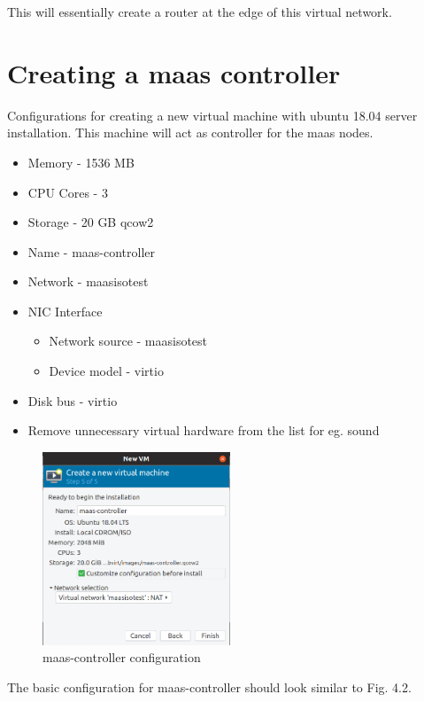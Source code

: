 This will essentially create a router at the edge of this virtual network.

\section{Creating a maas controller}

Configurations for creating a new virtual machine with ubuntu 18.04 server installation. This machine will act as controller for the maas nodes.

\begin{itemize}
    \setlength\itemsep{0em}
    \item Memory - 1536 MB
    \item CPU Cores - 3
    \item Storage - 20 GB qcow2 
    \item Name - maas-controller
    \item Network - maasisotest
    \item NIC Interface 
    \begin{itemize}
        \item Network source - maasisotest
        \item Device model - virtio
    \end{itemize}
    \item Disk bus - virtio
    \item Remove unnecessary virtual hardware from the list for eg. sound
\end{itemize}

\begin{figure}[!ht]
    \centering
    \includegraphics[width=0.5\textwidth]{images/4-2.png}
    \caption{maas-controller configuration}
\end{figure}

The basic configuration for maas-controller should look similar to Fig. 4.2.

